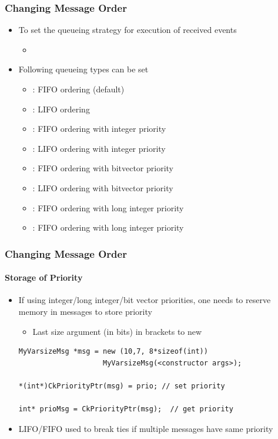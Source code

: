 \begin{frame}[fragile]
  \frametitle{Changing Message Order}
  \begin{itemize}
    \item To set the queueing strategy for execution of received events
    \begin{itemize}
      \item {}
    \end{itemize}
    \item Following queueing types can be set
    \begin{itemize}
      \item {} : FIFO ordering (default)
      \item {} : LIFO ordering
      \item {} : FIFO ordering with integer priority
      \item {} : LIFO ordering with integer priority
      \item {} : FIFO ordering with bitvector priority
      \item {} : LIFO ordering with bitvector priority
      \item {} : FIFO ordering with long integer priority
      \item {} : FIFO ordering with long integer priority
    \end{itemize}
 \end{itemize}
\end{frame}

\begin{frame}[fragile]
  \frametitle{Changing Message Order}
  \framesubtitle{Storage of Priority}
  \begin{itemize}
    \item If using integer/long integer/bit vector priorities, one needs to reserve memory in messages to store priority
     \begin{itemize}
       \item Last size argument (in bits) in brackets to new
     \end{itemize}
    \begin{lstlisting}
MyVarsizeMsg *msg = new (10,7, 8*sizeof(int))         
                    MyVarsizeMsg(<constructor args>);

*(int*)CkPriorityPtr(msg) = prio; // set priority

int* prioMsg = CkPriorityPtr(msg);  // get priority
    \end{lstlisting}
    \item LIFO/FIFO used to break ties if multiple messages have same priority
  \end{itemize}
\end{frame}


